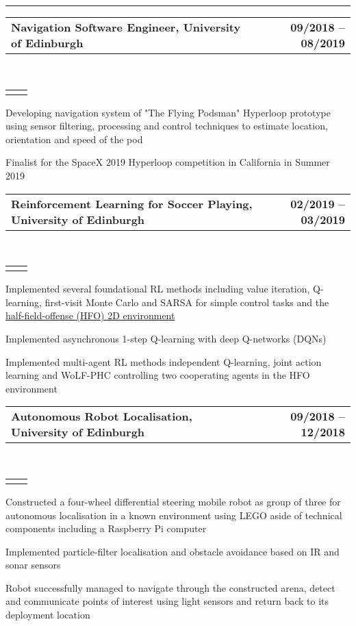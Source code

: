 \documentclass[]{lukas-cv-openfont}
\makeatletter
\newcommand{\headerrow}[2]
{\begin{tabular*}{\linewidth}{l@{\extracolsep{\fill}}r}
	\fontspec{Helvetica}\fontsize{12pt}{12pt}\selectfont\bfseries{\color{subheadings}#1} &
	\fontspec{Helvetica}\fontsize{12pt}{12pt}\selectfont\bfseries{\color{subheadings}#2} \\
\end{tabular*}}
\newcommand{\locationrow}[2]
{\begin{tabular*}{\linewidth}{l@{\extracolsep{\fill}}r}
        \color{headings}\scshape\fontspec{Heiti TC Medium}\fontsize{10pt}{12pt}\selectfont{#1}  &
        \color{headings}\scshape\fontspec{Heiti TC Medium}\fontsize{10pt}{12pt}\selectfont{#2}  \\
\end{tabular*}}
\makeatother
\begin{document}
\hrule
\vspace{0.4em}

\noindent
\headerrow{Navigation Software Engineer, University of Edinburgh}{09/2018 -- 08/2019}
\\
\locationrow{HYPED -- University of Edinburgh Hyperloop Team}{}
\begin{tightitemize}{1.7em}
    \item Developing navigation system of "The Flying Podsman" Hyperloop prototype using sensor filtering, processing and control techniques to estimate location, orientation and speed of the pod
    \item Finalist for the SpaceX 2019 Hyperloop competition in California in Summer 2019
\end{tightitemize}
\largesectionsep

\noindent
\headerrow{Reinforcement Learning for Soccer Playing, University of Edinburgh}{02/2019 -- 03/2019}
\\
\locationrow{Project for Reinforcement Learning Lecture}{}
\begin{tightitemize}{1.7em}
    \item Implemented several foundational RL methods including value iteration, Q-learning, first-visit Monte Carlo and SARSA for simple control tasks and the \href{https://github.com/LARG/HFO}{half-field-offense (HFO) 2D environment}
    \item Implemented asynchronous 1-step Q-learning with deep Q-networks (DQNs)
    \item Implemented multi-agent RL methods independent Q-learning, joint action learning and WoLF-PHC controlling two cooperating agents in the HFO environment
\end{tightitemize}
\largesectionsep

\noindent
\headerrow{Autonomous Robot Localisation, University of Edinburgh}{09/2018 -- 12/2018}
\\
\locationrow{Group Project for Robotics: Science and Systems Lecture}{}
\begin{tightitemize}{1.7em}
    \item Constructed a four-wheel differential steering mobile robot as group of three for autonomous localisation in a 
    known environment using LEGO aside of technical components including a Raspberry Pi computer
    \item Implemented particle-filter localisation and obstacle avoidance based on IR and sonar sensors
    \item Robot successfully managed to navigate through the constructed arena, detect and communicate points of
    interest using light sensors and return back to its deployment location
\end{tightitemize}
\largesectionsep
\end{document}
